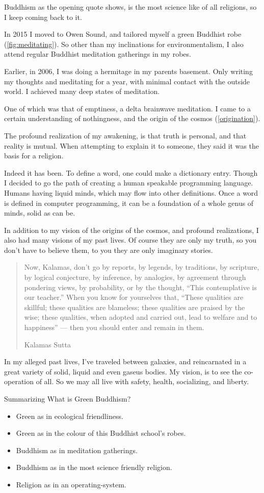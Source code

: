 Buddhism as the opening quote shows, is the most science like of all religions,
so I keep coming back to it. 

In 2015 I moved to Owen Sound, and tailored myself a green Buddhist
robe (\ref{fig:meditating}). So
other than my inclinations for environmentalism, I also attend regular Buddhist
meditation gatherings in my robes.

Earlier, in 2006, I was doing a hermitage in my parents basement. Only writing
my thoughts and meditating for a year, with minimal contact with the outside
world. I achieved many deep states of meditation.  

One of which was that of emptiness, a delta brainwave meditation. 
I came to a certain understanding of nothingness, and the origin of the
cosmos (\ref{origination}).

The profound realization of my awakening, is that truth is personal, and that
reality is mutual. When attempting to explain it to someone, they said it was
the basis for a religion. 

Indeed it has been. To define a word, one could make a dictionary entry. Though
I decided to go the path of creating a human speakable programming language.
Humans having liquid minds, which  may flow into other definitions. Once a word
is defined in computer programming, it can be a foundation of a whole genus of
minds, solid as can be.  

In addition to my vision of the origins of the cosmos, and profound
realizations, I also had many visions of my past lives. Of course they are only
my truth, so you don't have to believe them, to you they are only imaginary
stories. 


\blockquote[Kalamas Sutta\cite{kalamas}]{Now, Kalamas, don't go by reports, by legends, by traditions, 
by scripture, by logical conjecture, by inference, by analogies, by agreement 
through pondering views, by probability, or by the thought, ``This contemplative
 is our teacher.'' When you know for yourselves that, ``These qualities are 
skillful; these qualities are blameless; these qualities are praised by the 
wise; these qualities, when adopted and carried out, lead to welfare and 
to happiness'' — then you should enter and remain in them.
}

In my alleged past lives, I've traveled between galaxies, and reincarnated in a
great variety of solid, liquid and even gaseus bodies. My vision, is to see the
co-operation of all. So we may all live with safety, health, socializing, and
liberty. 

Summarizing What is Green Buddhism?
\begin{itemize}
  \item Green as in ecological friendliness.
  \item Green as in the colour of this Buddhist school's robes. 
  \item Buddhism as in meditation gatherings. 
  \item Buddhism as in the most science friendly
religion\cite{kalamas}\cite{singleAtom}. 
  \item Religion as in an operating-system.
\end{itemize}
